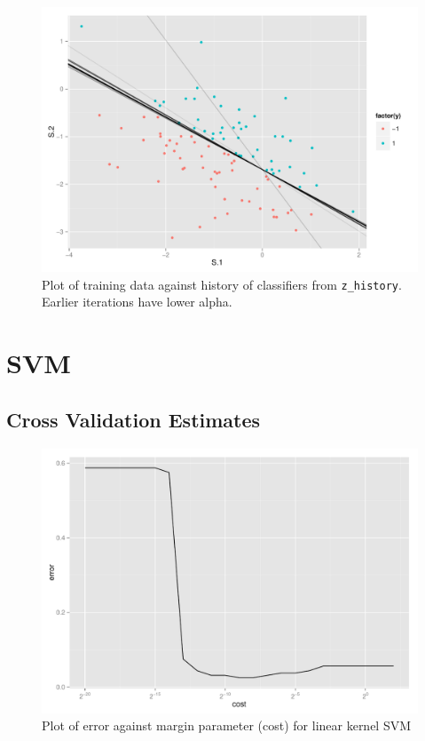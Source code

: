 \documentclass[11pt]{scrartcl}
\begin{document}
\begin{figure}[H]
\centering\includegraphics[width=\textwidth]{./hw2/r/train.pdf}
\caption{Plot of training data against history of classifiers from \texttt{z\_history}. Earlier iterations have lower alpha.}
\end{figure}

\section{SVM}

\subsection{Cross Validation Estimates}

\begin{figure}[H]
\centering\includegraphics[width=\textwidth]{./hw2/r/tune_linear.pdf}
\caption{Plot of error against margin parameter (cost) for linear kernel SVM}
\end{figure}
\end{document}
